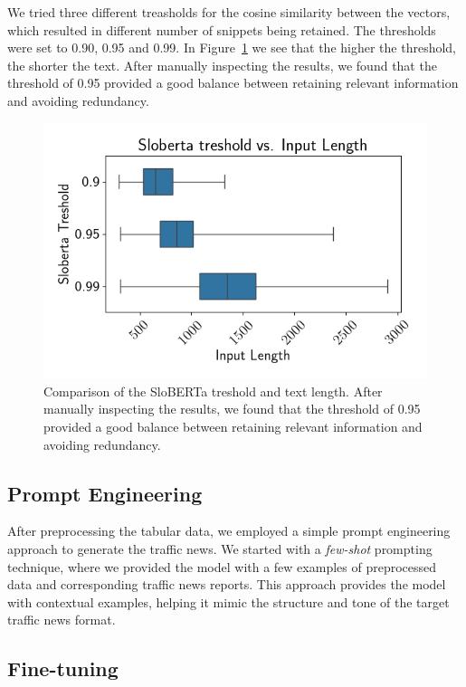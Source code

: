 \documentclass[fleqn,moreauthors,10pt]{ds_report}
\begin{document}
We tried three different treasholds for the cosine similarity between the vectors, which resulted in different number of snippets being retained. The thresholds were set to 0.90, 0.95 and 0.99. In Figure~\ref{fig:preprocessing} we see that the higher the threshold, the shorter the text. After manually inspecting the results, we found that the threshold of 0.95 provided a good balance between retaining relevant information and avoiding redundancy.

\begin{figure}[h]
    \centering
    \includegraphics[width=0.8\linewidth]{fig/treshold_vs_len.png}
    \caption{Comparison of the SloBERTa treshold and text length. After manually inspecting the results, we found that the threshold of 0.95 provided a good balance between retaining relevant information and avoiding redundancy.}
    \label{fig:preprocessing}
\end{figure}



\subsection*{Prompt Engineering}

After preprocessing the tabular data, we employed a simple prompt engineering approach to generate the traffic news.
We started with a \textit{few-shot} prompting \cite{promptingguide_fewshot} technique, where we provided the model
with a few examples of preprocessed data and corresponding traffic news reports. This approach provides the model
with contextual examples, helping it mimic the structure and tone of the target traffic news format.

\subsection*{Fine-tuning}
\end{document}
